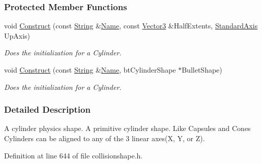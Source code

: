 \subsubsection*{Protected Member Functions}
\begin{DoxyCompactItemize}
\item 
void \hyperlink{classMezzanine_1_1CylinderCollisionShape_ab7b1d796b02acd1a0ca35f1f609e8901}{Construct} (const \hyperlink{namespaceMezzanine_acf9fcc130e6ebf08e3d8491aebcf1c86}{String} \&\hyperlink{classMezzanine_1_1CollisionShape_aac524c5c56fa4d158bc071f8aecfbe79}{Name}, const \hyperlink{classMezzanine_1_1Vector3}{Vector3} \&HalfExtents, \hyperlink{namespaceMezzanine_ab41a00a8c6a47b576dc987ec34e16ba1}{StandardAxis} UpAxis)
\begin{DoxyCompactList}\small\item\em Does the initialization for a Cylinder. \item\end{DoxyCompactList}\item 
void \hyperlink{classMezzanine_1_1CylinderCollisionShape_a34ed7408114b3863a14f2d8ff1b1b4d7}{Construct} (const \hyperlink{namespaceMezzanine_acf9fcc130e6ebf08e3d8491aebcf1c86}{String} \&\hyperlink{classMezzanine_1_1CollisionShape_aac524c5c56fa4d158bc071f8aecfbe79}{Name}, btCylinderShape $\ast$BulletShape)
\begin{DoxyCompactList}\small\item\em Does the initialization for a Cylinder. \item\end{DoxyCompactList}\end{DoxyCompactItemize}


\subsubsection{Detailed Description}
A cylinder physics shape. A primitive cylinder shape. Like Capsules and Cones Cylinders can be aligned to any of the 3 linear axes(X, Y, or Z). 

Definition at line 644 of file collisionshape.h.



